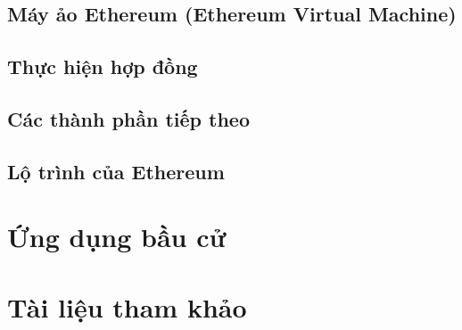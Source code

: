 \documentclass[12pt]{article}
\begin{document}
	\subsection{Máy ảo Ethereum (Ethereum Virtual Machine)}
	
	
	\subsection{Thực hiện hợp đồng}
	
	
	\subsection{Các thành phần tiếp theo}
	
	
	\subsection{Lộ trình của Ethereum}
	
		
	\section{Ứng dụng bầu cử}
	
	
	\section{Tài liệu tham khảo}
	
\end{document}

